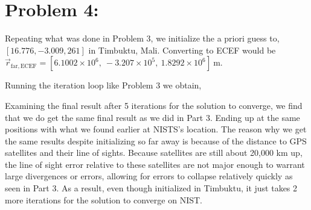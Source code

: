 \documentclass[11pt]{article}
\begin{document}
\newpage
\section*{Problem 4:}
\hspace*{2em}Repeating what was done in Problem 3, we initialize the a priori guess to, $[16.776, -3.009, 261]$ in Timbuktu, Mali. Converting to ECEF would be $\vec{r}_{\mathrm{far,ECEF}} = [6.1002\times10^{6},\ -3.207\times10^{5},\ 1.8292\times10^{6}]~\mathrm{m}$.

\hspace*{2em}Running the iteration loop like Problem 3 we obtain,

\begin{table}[h]
\centering
{}
\caption{State vector correction and updated position starting at Timbuktu}
\label{tab:timbuktu_iteration}
\end{table}

\hspace*{2em}Examining the final result after 5 iterations for the solution to converge, we find that we do get the same final result as we did in Part 3. Ending up at the same positions with what we found earlier at NISTS's location. The reason why we get the same results despite initializing so far away is because of the distance to GPS satellites and their line of sights. Because satellites are still about 20,000 km up, the line of sight error relative to these satellites are not major enough to warrant large divergences or errors, allowing for errors to collapse relatively quickly as seen in Part 3. As a result, even though initialized in Timbuktu, it just takes 2 more iterations for the solution to converge on NIST. 
\end{document}
